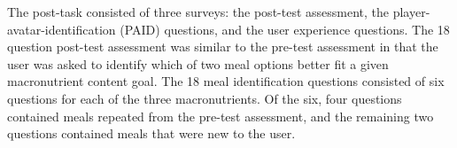 The post-task consisted of three surveys: the post-test assessment, the player-avatar-identification (PAID) questions, and the user experience questions.
The 18 question post-test assessment was similar to the pre-test assessment in that the user was asked to identify which of two meal options better fit a given macronutrient content goal.
The 18 meal identification questions consisted of six questions for each of the three macronutrients. Of the six, four questions contained meals repeated from the pre-test assessment, and the remaining two questions contained meals that were new to the user. 